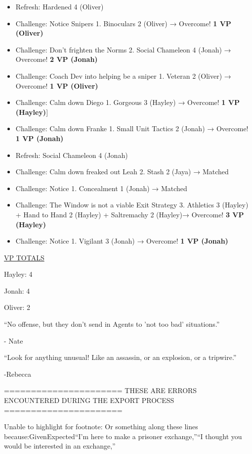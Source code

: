 \begin{itemize}
\item Refresh: Hardened 4 (Oliver)
\item Challenge: Notice Snipers 1. Binoculars 2 (Oliver) → Overcome! \textbf{1 VP (Oliver)}
\item Challenge: Don't frighten the Norms 2.  Social Chameleon 4 (Jonah) → Overcome! \textbf{2 VP (Jonah)}
\item Challenge: Coach Dev into helping be a sniper 1. Veteran 2 (Oliver) → Overcome! \textbf{1 VP (Oliver)}
\item Challenge: Calm down Diego 1. Gorgeous 3 (Hayley) → Overcome! \textbf{1 VP (Hayley)}{]} 
\item Challenge: Calm down Franke 1. Small Unit Tactics 2 (Jonah) → Overcome! \textbf{1 VP (Jonah)}
\item Refresh: Social Chameleon 4 (Jonah)
\item Challenge: Calm down freaked out Leah 2. Stash 2 (Jaya) →  Matched
\item Challenge: Notice 1. Concealment 1 (Jonah) → Matched
\item Challenge: The Window is not a viable Exit Strategy 3. Athletics 3 (Hayley) + Hand to Hand 2 (Hayley) + Saltremachy 2 (Hayley)→ Overcome! \textbf{3 VP (Hayley)}
\item Challenge: Notice 1. Vigilant 3 (Jonah)  → Overcome! \textbf{1 VP (Jonah)}
\end{itemize}





\underline{  {\LARGE VP TOTALS }  }

Hayley: 4

Jonah: 4

Oliver: 2



``No offense, but they don't send in Agents to 'not too bad' situations.''

        - Nate



``Look for anything unusual!  Like an assassin, or an explosion, or a tripwire.'' 

        -Rebecca


\iffalse

======================
THESE ARE ERRORS ENCOUNTERED DURING THE EXPORT PROCESS
======================

	Unable to highlight for footnote: Or something along these lines because:GivenExpected“I’m here to make a prisoner exchange,”“I thought you would be interested in an exchange,”

